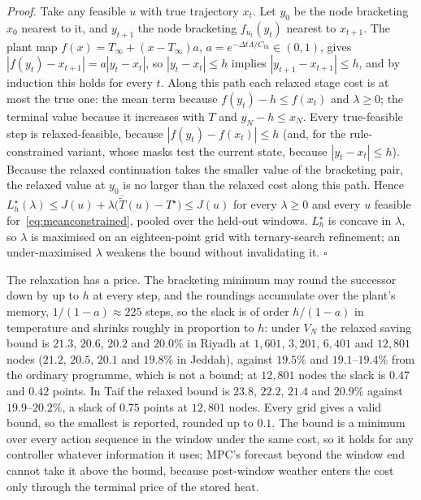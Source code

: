 \documentclass[pdflatex,sn-mathphys-num,iicol]{sn-jnl}
\theoremstyle{thmstyleone}\newtheorem{proposition}{Proposition}\newtheorem{corollary}{Corollary}
\theoremstyle{thmstyletwo}\newtheorem{remark}{Remark}\newtheorem{observation}{Observation}
\theoremstyle{thmstylethree}\newtheorem{definition}{Definition}
\newcommand{\Cth}{C_{\mathrm{th}}}
\begin{document}
\emph{Proof.} Take any feasible $u$ with true trajectory $x_t$. Let $y_0$ be the node bracketing $x_0$ nearest to it, and $y_{t+1}$ the node bracketing $f_{u_t}(y_t)$ nearest to $x_{t+1}$. The plant map $f(x)=T_\infty+(x-T_\infty)a$, $a=e^{-\Delta t\Lambda/\Cth}\in(0,1)$, gives $|f(y_t)-x_{t+1}|=a|y_t-x_t|$, so $|y_t-x_t|\le h$ implies $|y_{t+1}-x_{t+1}|\le h$, and by induction this holds for every $t$. Along this path each relaxed stage cost is at most the true one: the mean term because $f(y_t)-h\le f(x_t)$ and $\lambda\ge0$; the terminal value because it increases with $T$ and $y_N-h\le x_N$. Every true-feasible step is relaxed-feasible, because $|f(y_t)-f(x_t)|\le h$ (and, for the rule-constrained variant, whose masks test the current state, because $|y_t-x_t|\le h$). Because the relaxed continuation takes the smaller value of the bracketing pair, the relaxed value at $y_0$ is no larger than the relaxed cost along this path. Hence $L^{\star}_h(\lambda)\le J(u)+\lambda\bigl(\overline{\tilde T}(u)-T^{\star}\bigr)\le J(u)$ for every $\lambda\ge0$ and every $u$ feasible for~\eqref{eq:meanconstrained}, pooled over the held-out windows. $L^{\star}_h$ is concave in $\lambda$, so $\lambda$ is maximised on an eighteen-point grid with ternary-search refinement; an under-maximised $\lambda$ weakens the bound without invalidating it. \hfill$\square$

The relaxation has a price. The bracketing minimum may round the successor down by up to $h$ at every step, and the roundings accumulate over the plant's memory, $1/(1-a)\approx225$ steps, so the slack is of order $h/(1-a)$ in temperature and shrinks roughly in proportion to $h$: under $V_N$ the relaxed saving bound is $21.3$, $20.6$, $20.2$ and $20.0\%$ in Riyadh at $1{,}601$, $3{,}201$, $6{,}401$ and $12{,}801$ nodes ($21.2$, $20.5$, $20.1$ and $19.8\%$ in Jeddah), against $19.5\%$ and $19.1$--$19.4\%$ from the ordinary programme, which is not a bound; at $12{,}801$ nodes the slack is $0.47$ and $0.42$ points. In Taif the relaxed bound is $23.8$, $22.2$, $21.4$ and $20.9\%$ against $19.9$--$20.2\%$, a slack of $0.75$ points at $12{,}801$ nodes. Every grid gives a valid bound, so the smallest is reported, rounded up to $0.1$. The bound is a minimum over every action sequence in the window under the same cost, so it holds for any controller whatever information it uses; MPC's forecast beyond the window end cannot take it above the bound, because post-window weather enters the cost only through the terminal price of the stored heat.
\end{document}

